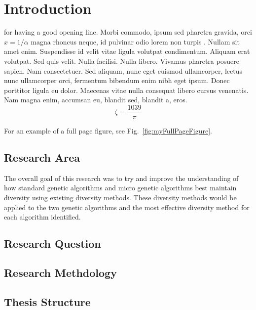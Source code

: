 

\chapter{Introduction}

 for having a good opening line. Morbi commodo, ipsum sed pharetra gravida, orci  $x = 1/\alpha$ magna rhoncus neque, id pulvinar odio lorem non turpis \cite{Eigen1971, Knuth1968}. Nullam sit amet enim. Suspendisse id velit vitae ligula volutpat condimentum. Aliquam erat volutpat. Sed quis velit. Nulla facilisi. Nulla libero. Vivamus pharetra posuere sapien. Nam consectetuer. Sed aliquam, nunc eget euismod ullamcorper, lectus nunc ullamcorper orci, fermentum bibendum enim nibh eget ipsum. Donec porttitor ligula eu dolor. Maecenas vitae nulla consequat libero cursus venenatis. Nam magna enim, accumsan eu, blandit sed, blandit a, eros.
$$\zeta = \frac{1039}{\pi}$$


For an example of a full page figure, see Fig.~\ref{fig:myFullPageFigure}.

\section{Research Area}
The overall goal of this research was to try and improve the understanding of how standard genetic algorithms and micro genetic algorithms best maintain diversity using existing diversity methods. These diversity methods would be applied to the two genetic algorithms and the most effective diversity method for each algorithm identified.
\section{Research Question}
\section{Research Methdology}
\section{Thesis Structure}


